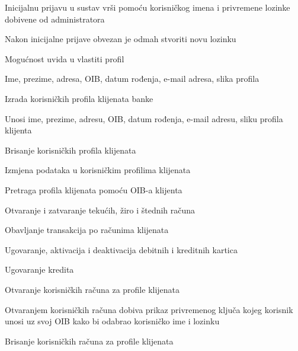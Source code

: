 \begin{packed_enum}
				\begin{packed_enum}
					
					\item Inicijalnu prijavu u sustav vrši pomoću korisničkog imena i privremene lozinke dobivene od administratora
					\begin{packed_enum}
						\item Nakon inicijalne prijave obvezan je odmah stvoriti novu lozinku
					\end{packed_enum}
					\item Mogućnost uvida u vlastiti profil
					\begin{packed_enum}
						\item Ime, prezime, adresa, OIB, datum rođenja, e-mail adresa, slika profila
					\end{packed_enum}
					\item Izrada korisničkih profila klijenata banke
					\begin{packed_enum}
						\item Unosi ime, prezime, adresu, OIB, datum rođenja, e-mail adresu, sliku profila klijenta
					\end{packed_enum}
					\item Brisanje korisničkih profila klijenata
					\item Izmjena podataka u korisničkim profilima klijenata
					\item Pretraga profila klijenata pomoću OIB-a klijenta
					\item Otvaranje i zatvaranje tekućih, žiro i štednih računa
					\item Obavljanje transakcija po računima klijenata
					\item Ugovaranje, aktivacija i deaktivacija debitnih i kreditnih kartica
					\item Ugovaranje kredita
					\item Otvaranje korisničkih računa za profile klijenata
					\begin{packed_enum}
						\item Otvaranjem korisničkih računa dobiva prikaz privremenog ključa kojeg korisnik unosi uz svoj OIB kako bi odabrao korisničko ime i lozinku
					\end{packed_enum}
					\item Brisanje korisničkih računa za profile klijenata
					
				\end{packed_enum}
			
				\item	{}
				

\end{packed_enum}

